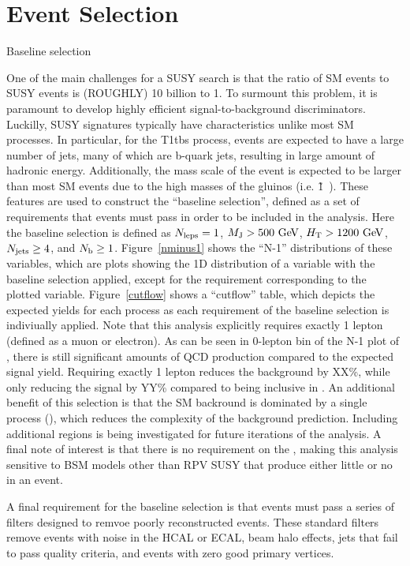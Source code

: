 \chapter{Event Selection}

\begin{section}{Baseline selection}

One of the main challenges for a SUSY search is that the ratio of SM events to SUSY events is (ROUGHLY) 10 billion to 1.
To surmount this problem, it is paramount to develop highly efficient signal-to-background discriminators.
Luckilly, SUSY signatures typically have characteristics unlike most SM processes.
In particular, for the T1tbs process, events are expected to have a large number of jets, many of which are b-quark jets, resulting in large amount of hadronic energy.
Additionally, the mass scale of the event is expected to be larger than most SM events due to the high masses of the gluinos (i.e. \~1~\TeV).
These features are used to construct the ``baseline selection'', defined as a set of requirements that events must pass in order to be included in the analysis.
Here the baseline selection is defined as $N_{\mathrm{leps}}=1$, $M_\mathrm{J}>500~\mathrm{Ge\kern -0.1em V}$, $H_\mathrm{T}>1200~\mathrm{Ge\kern -0.1em V}$, $N_{\mathrm{jets}}\geq4$, and $N_\mathrm{b}\geq1$.
Figure~\ref{nminus1} shows the ``N-1'' distributions of these variables, which are plots showing the 1D distribution of a variable with the baseline selection applied, except for the requirement corresponding to the plotted variable.
Figure~\ref{cutflow} shows a ``cutflow'' table, which depicts the expected yields for each process as each requirement of the baseline selection is indiviually applied.
Note that this analysis explicitly requires exactly 1 lepton (defined as a muon or electron).
As can be seen in 0-lepton bin of the N-1 plot of \Nleps, there is still significant amounts of QCD production compared to the expected signal yield.
Requiring exactly 1 lepton reduces the background by XX\%, while only reducing the signal by YY\% compared to being inclusive in \Nleps.
An additional benefit of this selection is that the SM backround is dominated by a single process (\ttbar), which reduces the complexity of the background prediction.
Including additional \Nleps regions is being investigated for future iterations of the analysis.
A final note of interest is that there is no requirement on the \MET, making this analysis sensitive to BSM models other than RPV SUSY that produce either little or no \MET in an event.

A final requirement for the baseline selection is that events must pass a series of filters designed to remvoe poorly reconstructed events. These standard filters remove events with noise in the HCAL or ECAL, beam halo effects, jets that fail to pass quality criteria, and events with zero good primary vertices.

\end{section}

